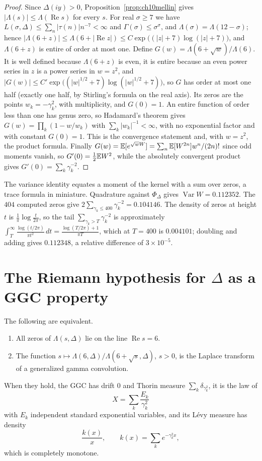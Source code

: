 \begin{proof}
Since $\Delta(iy)>0$, Proposition~\ref{prop:ch10mellin} gives $|\Lambda(s)|\le\Lambda(\operatorname{Re}s)$ for every $s$. For real $\sigma\ge7$ we have $L(\sigma,\Delta)\le\sum_n|\tau(n)|n^{-7}<\infty$ and $\Gamma(\sigma)\le\sigma^\sigma$, and $\Lambda(\sigma) = \Lambda(12-\sigma)$; hence $|\Lambda(6+z)|\le\Lambda(6+|\operatorname{Re}z|)\le C\exp\bigl((|z|+7)\log(|z|+7)\bigr)$, and $\Lambda(6+z)$ is entire of order at most one. Define $G(w) = \Lambda(6+\sqrt w)/\Lambda(6)$. It is well defined because $\Lambda(6+z)$ is even, it is entire because an even power series in $z$ is a power series in $w = z^2$, and $|G(w)|\le C'\exp\bigl((|w|^{1/2}+7)\log(|w|^{1/2}+7)\bigr)$, so $G$ has order at most one half (exactly one half, by Stirling's formula on the real axis). Its zeros are the points $w_k = -\gamma_k^2$, with multiplicity, and $G(0) = 1$. An entire function of order less than one has genus zero, so Hadamard's theorem gives $G(w) = \prod_k(1-w/w_k)$ with $\sum_k|w_k|^{-1}<\infty$, with no exponential factor and with constant $G(0)=1$. This is the convergence statement and, with $w = z^2$, the product formula. Finally $G(w) = \mathbb{E}[e^{\sqrt wW}] = \sum_n\mathbb{E}[W^{2n}]w^n/(2n)!$ since odd moments vanish, so $G'(0) = \frac12\mathbb{E} W^2$, while the absolutely convergent product gives $G'(0) = \sum_k\gamma_k^{-2}$.
\end{proof}

The variance identity equates a moment of the kernel with a sum over zeros, a trace formula in miniature. Quadrature against $\Phi_\Delta$ gives $\operatorname{Var}W = 0.112352$. The $404$ computed zeros give $2\sum_{\gamma_k\le400}\gamma_k^{-2} = 0.104146$. The density of zeros at height $t$ is $\frac1\pi\log\frac{t}{2\pi}$, so the tail $\sum_{\gamma_k>T}\gamma_k^{-2}$ is approximately $\int_T^\infty\frac{\log(t/2\pi)}{\pi t^2}\,dt = \frac{\log(T/2\pi)+1}{\pi T}$, which at $T = 400$ is $0.004101$; doubling and adding gives $0.112348$, a relative difference of $3\times10^{-5}$.

\section{The Riemann hypothesis for $\Delta$ as a GGC property}

\begin{theorem}\label{thm:ch10ggc}
The following are equivalent.
\begin{enumerate}
\item[(i)] All zeros of $\Lambda(s,\Delta)$ lie on the line $\operatorname{Re}s = 6$.
\item[(ii)] The function $s\mapsto\Lambda(6,\Delta)/\Lambda(6+\sqrt s,\Delta)$, $s>0$, is the Laplace transform of a generalized gamma convolution.
\end{enumerate}
When they hold, the GGC has drift $0$ and Thorin measure $\sum_k\delta_{\gamma_k^2}$, it is the law of
\[
X = \sum_k\frac{E_k}{\gamma_k^2}
\]
with $E_k$ independent standard exponential variables, and its L\'evy measure has density
\[
\frac{k(x)}{x},\qquad k(x) = \sum_ke^{-\gamma_k^2x},
\]
which is completely monotone.
\end{theorem}

